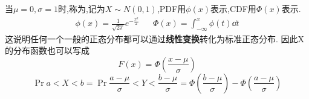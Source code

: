 当$\mu=0,\sigma=1$时,称为,记为$X\sim N(0,1)$,PDF用$\phi(x )$表示,CDF用$\Phi(x )$表示.
\begin{align}
    \phi(x ) = \frac{1}{\sqrt{2\pi}}e^{-\frac{x^2}{2}} &  & \Phi(x ) = \int_{-\infty}^{x}\phi(t)\dd t
\end{align}
这说明任何一个一般的正态分布都可以通过\textbf{线性变换}转化为标准正态分布.
因此X的分布函数也可以写成
\[F(x) = \Phi\left(\frac{x-\mu}{\sigma}\right)\]
\[\Pr{a<X<b}= \Pr{\frac{a-\mu}{\sigma}<Y<\frac{b-\mu}{\sigma}} = \Phi\left(\frac{b-\mu}{\sigma}\right) - \Phi\left(\frac{a-\mu}{\sigma}\right)\]